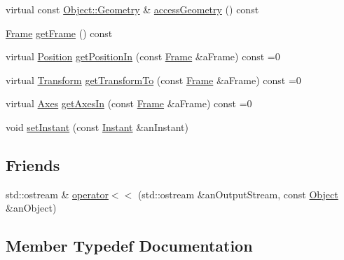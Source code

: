 \begin{DoxyCompactItemize}
\item 
virtual const \hyperlink{classlibrary_1_1physics_1_1env_1_1_object_a750fd821b17667fec9e0a4eda23af048}{Object\+::\+Geometry} \& \hyperlink{classlibrary_1_1physics_1_1env_1_1_object_ac7a98e912dadb573e557eb91c8f5e891}{access\+Geometry} () const
\item 
\hyperlink{classlibrary_1_1physics_1_1coord_1_1_frame}{Frame} \hyperlink{classlibrary_1_1physics_1_1env_1_1_object_a5f5434fd62619d61812ce7505f44260e}{get\+Frame} () const
\item 
virtual \hyperlink{classlibrary_1_1physics_1_1coord_1_1_position}{Position} \hyperlink{classlibrary_1_1physics_1_1env_1_1_object_ad9c15bf11720fc7432f2c0fa3490531b}{get\+Position\+In} (const \hyperlink{classlibrary_1_1physics_1_1coord_1_1_frame}{Frame} \&a\+Frame) const =0
\item 
virtual \hyperlink{classlibrary_1_1physics_1_1coord_1_1_transform}{Transform} \hyperlink{classlibrary_1_1physics_1_1env_1_1_object_a21312b7217aeb12086681401b4a6c41f}{get\+Transform\+To} (const \hyperlink{classlibrary_1_1physics_1_1coord_1_1_frame}{Frame} \&a\+Frame) const =0
\item 
virtual \hyperlink{classlibrary_1_1physics_1_1coord_1_1_axes}{Axes} \hyperlink{classlibrary_1_1physics_1_1env_1_1_object_a165a95ae6f63e5db38a03c3227dba4fc}{get\+Axes\+In} (const \hyperlink{classlibrary_1_1physics_1_1coord_1_1_frame}{Frame} \&a\+Frame) const =0
\item 
void \hyperlink{classlibrary_1_1physics_1_1env_1_1_object_a6a215fef40593ef3dae3bf2b681339d2}{set\+Instant} (const \hyperlink{classlibrary_1_1physics_1_1time_1_1_instant}{Instant} \&an\+Instant)
\end{DoxyCompactItemize}
\subsection*{Friends}
\begin{DoxyCompactItemize}
\item 
std\+::ostream \& \hyperlink{classlibrary_1_1physics_1_1env_1_1_object_a418df9bf4a73078f3d494edef1743f8d}{operator$<$$<$} (std\+::ostream \&an\+Output\+Stream, const \hyperlink{classlibrary_1_1physics_1_1env_1_1_object}{Object} \&an\+Object)
\end{DoxyCompactItemize}


\subsection{Member Typedef Documentation}
\mbox{\label{classlibrary_1_1physics_1_1env_1_1_object_a750fd821b17667fec9e0a4eda23af048}} 
